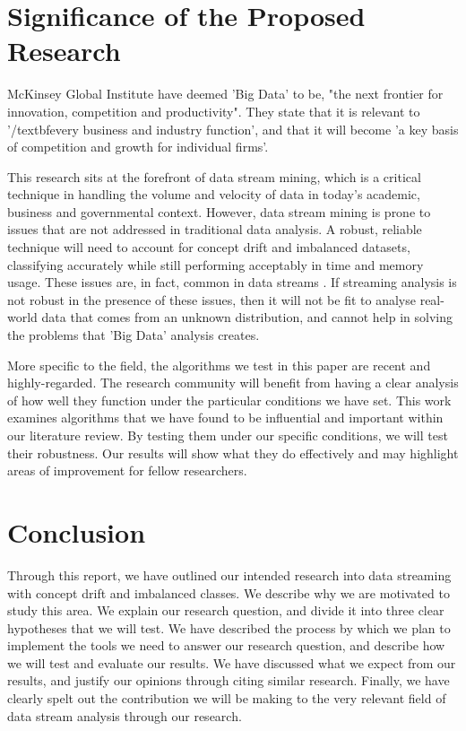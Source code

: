 \documentclass[11pt]{article}\usepackage[]{graphicx}\usepackage[]{color}
\begin{document}
\section{Significance of the Proposed Research}

McKinsey Global Institute \cite{mckinsey} have deemed 'Big Data' to be, "the next frontier for innovation, competition and productivity". They state that it is relevant to '/textbf{every} business and industry function', and that it will become 'a key basis of competition and growth for individual firms'.

This research sits at the forefront of data stream mining, which is a critical technique in handling the volume and velocity of data in today's academic, business and governmental context. However, data stream mining is prone to issues that are not addressed in traditional data analysis. A robust, reliable technique will need to account for concept drift and imbalanced datasets, classifying accurately while still performing acceptably in time and memory usage. These issues are, in fact, common in data streams \cite{wan13}. If streaming analysis is not robust in the presence of these issues, then it will not be fit to analyse real-world data that comes from an unknown distribution, and cannot help in solving the problems that 'Big Data' analysis creates.

More specific to the field, the algorithms we test in this paper are recent and highly-regarded. The research community will benefit from having a clear analysis of how well they function under the particular conditions we have set. This work examines algorithms that we have found to be influential and important within our literature review. By testing them under our specific conditions, we will test their robustness. Our results will show what they do effectively and may highlight areas of improvement for fellow researchers.

\section{Conclusion}

Through this report, we have outlined our intended research into data streaming with concept drift and imbalanced classes. We describe why we are motivated to study this area. We explain our research question, and divide it into three clear hypotheses that we will test. We have described the process by which we plan to implement the tools we need to answer our research question, and describe how we will test and evaluate our results. We have discussed what we expect from our results, and justify our opinions through citing similar research. Finally, we have clearly spelt out the contribution we will be making to the very relevant field of data stream analysis through our research.

\newpage


\end{document}
